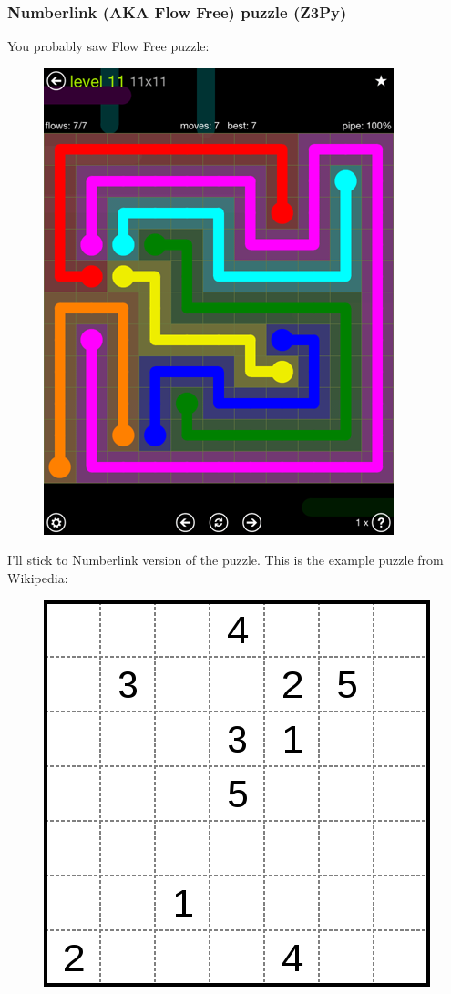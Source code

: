 \subsubsection{Numberlink (\ac{AKA} Flow Free) puzzle (Z3Py)}

You probably saw Flow Free puzzle:

\begin{figure}[H]
\centering
\includegraphics[scale=0.3]{puzzles/numberlink/Z3/flow-extreme-11-11.png}
\caption{}
\end{figure}

I'll stick to Numberlink version of the puzzle. This is the example puzzle from Wikipedia:

\begin{figure}[H]
\centering
\includegraphics[scale=0.3]{puzzles/numberlink/Z3/424px-Numberlink_puzzle.svg.png}
\caption{}
\end{figure}

